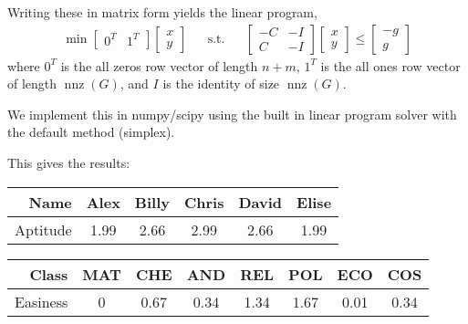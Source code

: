 \documentclass[10pt]{article}
\begin{document}
\begin{solution}[Solution]
    Writing these in matrix form yields the linear program,
    \begin{align*}
        \min \left[\begin{array}{cc} 0^T & 1^T\end{array}\right]\left[\begin{array}{c}x \\ y\end{array}\right]
            && \text{s.t.} &&
        \left[\begin{array}{cc}-C & -I \\ C & -I\end{array}\right] \left[\begin{array}{c}x\\y\end{array}\right] \leq \left[\begin{array}{c}-g \\ g\end{array}\right]
    \end{align*}
    where \( 0^T \) is the all zeros row vector of length \( n+m \), \( 1^T \) is the all ones row vector of length \( \operatorname{nnz}(G) \), and \( I \) is the identity of size \( \operatorname{nnz}(G) \).
    
    We implement this in numpy/scipy using the built in linear program solver with the default method (simplex).
    


    This gives the results:
    \begin{table}[h] \centering
    \begin{tabular}{r|ccccc}
        Name & Alex & Billy & Chris & David & Elise \\ \hline
        Aptitude & 1.99 & 2.66 & 2.99 & 2.66 & 1.99    
    \end{tabular}
    \end{table}
    \begin{table}[h]\centering
    \begin{tabular}{r|ccccccc}\centering
            Class & MAT & CHE & AND & REL & POL & ECO & COS \\ \hline
            Easiness & 0 & 0.67 & 0.34 & 1.34 & 1.67 & 0.01 & 0.34
    \end{tabular}
    \end{table}

    


\end{solution}
\end{document}
